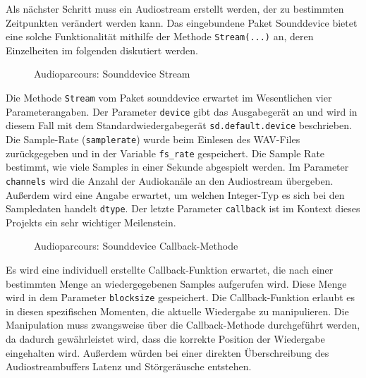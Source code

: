 Als nächster Schritt muss ein Audiostream erstellt werden, der zu bestimmten Zeitpunkten verändert werden kann. Das eingebundene Paket Sounddevice bietet eine solche Funktionalität mithilfe der Methode \texttt{Stream(...)} an, deren Einzelheiten im folgenden diskutiert werden.

\begin{figure}[h!]
	
	\caption{Audioparcours: Sounddevice Stream}
	\label{fig:audioparkour_sd_stream}
\end{figure}

Die Methode \texttt{Stream} vom Paket sounddevice erwartet im Wesentlichen vier Parameterangaben. Der Parameter \texttt{device} gibt das Ausgabegerät an und wird in diesem Fall mit dem Standardwiedergabegerät \texttt{sd.default.device} beschrieben. Die Sample-Rate (\texttt{samplerate}) wurde beim Einlesen des WAV-Files zurückgegeben und in der Variable \texttt{fs\_rate} gespeichert. Die Sample Rate bestimmt, wie viele Samples in einer Sekunde abgespielt werden. Im Parameter \texttt{channels} wird die Anzahl der Audiokanäle an den Audiostream übergeben. Außerdem wird eine Angabe erwartet, um welchen Integer-Typ es sich bei den Sampledaten handelt \texttt{dtype}. Der letzte Parameter \texttt{callback} ist im Kontext dieses Projekts ein sehr wichtiger Meilenstein. 

\begin{figure}[h!]
	
	
	
	
	
	\caption{Audioparcours: Sounddevice Callback-Methode}
	\label{fig:audioparkour_sd_callback}
\end{figure}

Es wird eine individuell erstellte Callback-Funktion erwartet, die nach einer bestimmten Menge an wiedergegebenen Samples aufgerufen wird. Diese Menge wird in dem Parameter \texttt{blocksize} gespeichert. 
Die Callback-Funktion erlaubt es in diesen spezifischen Momenten, die aktuelle Wiedergabe zu manipulieren. Die Manipulation muss zwangsweise über die Callback-Methode durchgeführt werden, da dadurch gewährleistet wird, dass die korrekte Position der Wiedergabe eingehalten wird. Außerdem würden bei einer direkten Überschreibung des Audiostreambuffers Latenz und Störgeräusche entstehen.

